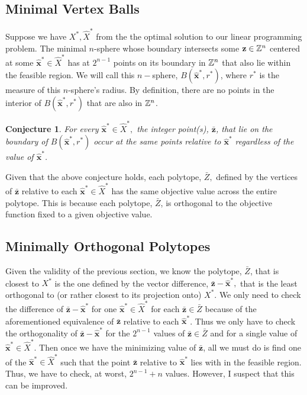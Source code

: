 \documentclass[conference]{IEEEtran}
\numberwithin{equation}{section}
\numberwithin{figure}{section}
\theoremstyle{plain}
\newtheorem{conj}[equation]{Conjecture}
\theoremstyle{definition}
\newcommand{\Z}{\ensuremath \mathbb{Z}}
\newcommand{\1}{\ensuremath \mathbbm{1}}
\begin{document}
\subsection{Minimal Vertex Balls}
Suppose we have $X^*,\hat{X}^*$ from the the optimal solution to our linear 
programming problem. The minimal $n$-sphere whose boundary intersects some 
$\mathbf{z} \in \Z^n$ centered at some $\mathbf{\hat{x}}^* \in \hat{X}^*$ has at 
$2^{n-1}$ points on its boundary in $\Z^n$ that also lie within the feasible 
region. We will call this $n-$sphere, $B(\mathbf{\hat{x}}^*,r^*)$, where $r^*$ is 
the measure of this $n$-sphere's radius. By definition, there are no points in 
the interior of $B(\mathbf{\hat{x}}^*,r^*)$ that are also in $\Z^n$. \\
\begin{conj}
  For every $\mathbf{\hat{x}}^* \in \hat{X}^*,$ the integer point(s), 
  $\mathbf{\bar{z}}$, that lie on the boundary of $B(\mathbf{\hat{x}}^*,r^*)$ 
  occur at the same points relative to $\mathbf{\hat{x}}^*$ regardless of the 
  value of $\mathbf{\hat{x}}^*$. \\
\end{conj}
Given that the above conjecture holds, each polytope, $\bar{Z},$ defined by the 
vertices of $\mathbf{\bar{z}}$ relative to each $\mathbf{\hat{x}}^* \in 
\hat{X}^*$ has the same objective value across the entire polytope. This is 
because each polytope, $\bar{Z}$, is orthogonal to the objective function fixed 
to a given objective value. \\

\subsection{Minimally Orthogonal Polytopes}
Given the validity of the previous section, we know the polytope, $\bar{Z}$, that 
is closest to $X^*$ is the one defined by the vector difference, 
$\mathbf{\bar{z}} - \mathbf{\hat{x}}^*,$ that is the least orthogonal to (or 
rather closest to its projection onto) $X^*$. We only need to check the 
difference of $\mathbf{\bar{z}} - \mathbf{\hat{x}}^*$ for one $\mathbf{\hat{x}}^* 
\in \hat{X}^*$ for each $\mathbf{\bar{z}} \in \bar{Z}$ because of the 
aforementioned equivalence of $\mathbf{\bar{z}}$ relative to each 
$\mathbf{\hat{x}}^*$. Thus we only have to check the orthogonality of 
$\mathbf{\bar{z}} - \mathbf{\hat{x}}^*$ for the $2^{n-1}$ values of 
$\mathbf{\bar{z}} \in \bar{Z}$ and for a single value of $\mathbf{\hat{x}}^* \in 
\hat{X}^*$. Then once we have the minimizing value of $\mathbf{\bar{z}}$, all  we 
must do is find one of the $\mathbf{\hat{x}}^* \in \hat{X}^*$ such that the point 
$\mathbf{\bar{z}}$ relative to $\mathbf{\hat{x}}^*$ lies with in the feasible 
region. Thus, we have to check, at worst, $2^{n-1} + n$ values. However, I 
suspect that this can be improved. \\
\end{document}

